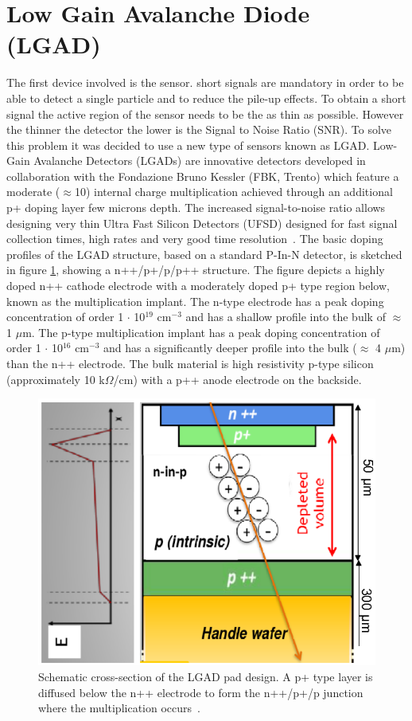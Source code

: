 \section{Low Gain Avalanche Diode (LGAD)}\label{lgad}
\noindent The first device involved is the sensor.
short signals are mandatory in order to be able to detect a single particle and to reduce the pile-up effects.
To obtain a short signal the active region of the sensor needs to be the as thin as possible. However the thinner the detector the lower is the Signal to Noise Ratio (SNR).
To solve this problem it was decided to use a new type of sensors known as LGAD.
\noindent Low-Gain Avalanche Detectors (LGADs) are innovative detectors developed in collaboration with the Fondazione Bruno Kessler (FBK, Trento) which feature a moderate ($\approx$10) internal charge multiplication achieved through an additional p+ doping layer few microns depth. The increased signal-to-noise ratio allows designing very thin Ultra Fast Silicon Detectors (UFSD) designed for fast signal collection times, high rates and very good time resolution~\cite{lgad}.
The basic doping profiles of the LGAD structure, based on a standard P-In-N detector, is sketched in figure \ref{fig:ufsdlgad}, showing a n++/p+/p/p++ structure.
The figure depicts a highly doped n++ cathode electrode with a moderately doped p+ type region
below, known as the multiplication implant. The n-type electrode has a peak doping concentration
of order 1 $\cdot$ 10$^{19}$ cm$^{-3}$ and has a shallow profile into the bulk of $\approx$ 1 $\mu$m.
The p-type multiplication implant has a peak doping concentration of order 1 $\cdot$ 10$^{16}$ cm$^{-3}$
and has a significantly deeper profile into the bulk ($\approx$ 4 $\mu$m) than the n++ electrode. The bulk
material is high resistivity p-type silicon (approximately 10 k$\Omega$/cm) with a p++ anode electrode
on the backside.
\begin{figure}[H]
	\centering
	\includegraphics[width=0.35\linewidth]{IMG/ch2/UFSDLGAD.png}
	\caption{Schematic cross-section of the LGAD pad design. A p+ type layer is diffused below the n++ electrode to form the n++/p+/p junction where the multiplication occurs~\cite{lgad2}.}
	\label{fig:ufsdlgad}
\end{figure}
